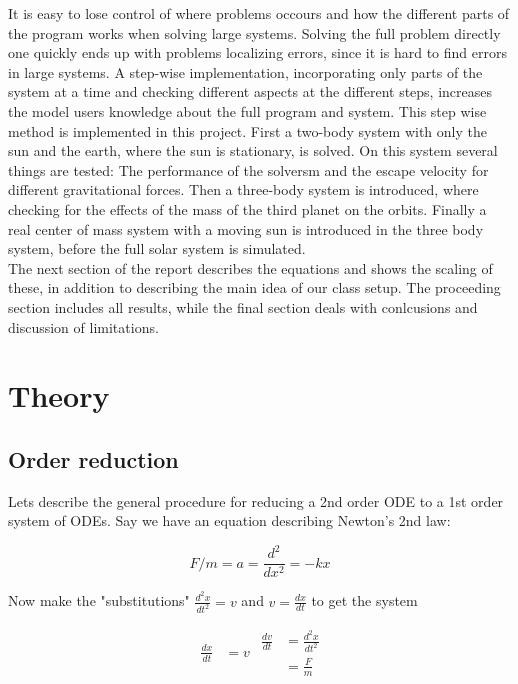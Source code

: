 \documentclass{article}
\begin{document}
It is easy to lose control of where problems occours and how the different parts of the program works when solving large systems. Solving the full problem directly one quickly ends up with problems localizing errors, since it is hard to find errors in large systems. A step-wise implementation, incorporating only parts of the system at a time and checking different aspects at the different steps, increases the model users knowledge about the full program and system. This step wise method is implemented in this project. First a two-body system with only the sun and the earth, where the sun is stationary, is solved. On this system several things are tested: The performance of the solversm and the escape velocity for different gravitational forces. Then a three-body system is introduced, where checking for the effects of the mass of the third planet on the orbits. Finally a real center of mass system with a moving sun is introduced in the three body system, before the full solar system is simulated. \\

The next section of the report describes the equations and shows the scaling of these, in addition to describing the main idea of our class setup. The proceeding section includes all results, while the final section deals with conlcusions and discussion of limitations.


\section{Theory}

\subsection{Order reduction}
Lets describe the general procedure for reducing a 2nd order ODE to a 1st order system of ODEs. Say we have an equation describing Newton's 2nd law:

\begin{equation}
F/m = a = \frac{d^2}{dx^2} = -kx
\end{equation}

Now make the "substitutions" $\frac{d^2x}{dt^2} = v$ and $v = \frac{dx}{dt}$ to get the system

\begin{subequations}
	\begin{align}\label{eq:dxdt}
	\frac{dx}{dt} &= v
	\end{align}
	
	\begin{align}
	\frac{dv}{dt} &= \frac{d^2x}{dt^2}\\
	 &= \frac{F}{m}\label{eq:dvdt}
	\end{align}
\end{subequations}
\end{document}
